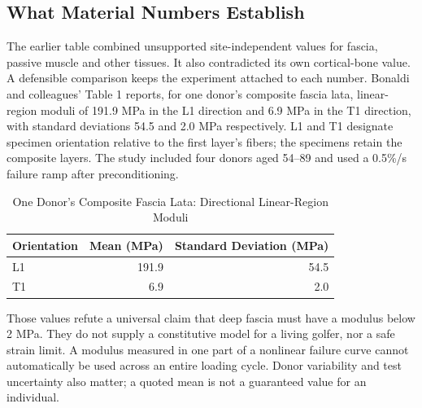 \subsection{What Material Numbers Establish}

The earlier table combined unsupported site-independent values for fascia, passive muscle and other tissues. It also contradicted its own cortical-bone value. A defensible comparison keeps the experiment attached to each number. Bonaldi and colleagues' Table 1 reports, for one donor's composite fascia lata, linear-region moduli of 191.9 MPa in the L1 direction and 6.9 MPa in the T1 direction, with standard deviations 54.5 and 2.0 MPa respectively. L1 and T1 designate specimen orientation relative to the first layer's fibers; the specimens retain the composite layers. The study included four donors aged 54--89 and used a 0.5\%/s failure ramp after preconditioning. \citep{glossaryFascia2023}


\begin{table}[H]
\centering
\caption{One Donor's Composite Fascia Lata: Directional Linear-Region Moduli}
\label{tab:ch12:stiffness}
\begin{tabular}{lrr}
\toprule
Orientation & Mean (MPa) & Standard Deviation (MPa) \\
\midrule
L1 & 191.9 & 54.5 \\
T1 & 6.9 & 2.0 \\
\bottomrule
\end{tabular}
\end{table}


Those values refute a universal claim that deep fascia must have a modulus below 2 MPa. They do not supply a constitutive model for a living golfer, nor a safe strain limit. A modulus measured in one part of a nonlinear failure curve cannot automatically be used across an entire loading cycle. Donor variability and test uncertainty also matter; a quoted mean is not a guaranteed value for an individual.

